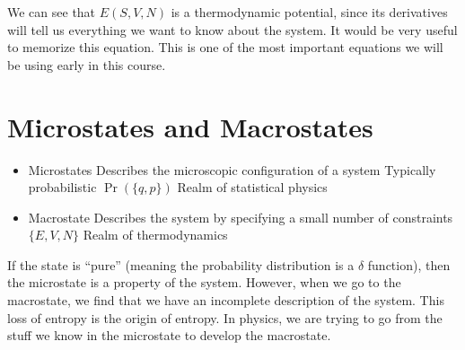 \documentclass[a4paper,twoside,master.tex]{subfiles}
\begin{document}
We can see that $ E(S,V,N) $ is a thermodynamic potential, since its derivatives will tell us everything we want to know about the system. It would be very useful to memorize this equation. This is one of the most important equations we will be using early in this course.

\section{Microstates and Macrostates}
\label{sec:microstates_and_macrostates}

\begin{itemize}
    \item Microstates
        \subitem Describes the microscopic configuration of a system
        \subitem Typically probabilistic
        \subitem $ \Pr(\{q,p\}) $
        \subitem Realm of statistical physics
    \item Macrostate
        \subitem Describes the system by specifying a small number of constraints
        \subitem $ \{E,V,N\} $
        \subitem Realm of thermodynamics
\end{itemize}

If the state is ``pure'' (meaning the probability distribution is a $\delta$ function), then the microstate is a property of the system. However, when we go to the macrostate, we find that we have an incomplete description of the system. This loss of entropy is the origin of entropy. In physics, we are trying to go from the stuff we know in the microstate to develop the macrostate.
\end{document}
